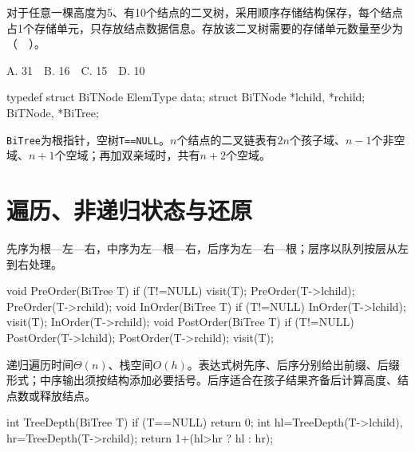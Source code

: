 对于任意一棵高度为5、有10个结点的二叉树，采用顺序存储结构保存，每个结点占1个存储单元，只存放结点数据信息。存放该二叉树需要的存储单元数量至少为（　）。

A. 31　B. 16　C. 15　D. 10

\par\smallskip\noindent\begin{minipage}{\linewidth}
\begin{codeblock}[language={C++}]
typedef struct BiTNode {
    ElemType data;
    struct BiTNode *lchild, *rchild;
} BiTNode, *BiTree;
\end{codeblock}
\end{minipage}\par\smallskip

\texttt{BiTree}为根指针，空树\texttt{T=\allowbreak{}=\allowbreak{}NULL}。\(n\)个结点的二叉链表有\(2n\)个孩子域、\(n-1\)个非空域、\(n+1\)个空域；再加双亲域时，共有\(n+2\)个空域。

\section{遍历、非递归状态与还原}\label{DS05-traversal}

先序为根---左---右，中序为左---根---右，后序为左---右---根；层序以队列按层从左到右处理。

\par\smallskip\noindent\begin{minipage}{\linewidth}
\begin{codeblock}[language={C++}]
void PreOrder(BiTree T) {
    if (T!=NULL) {
        visit(T);
        PreOrder(T->lchild);
        PreOrder(T->rchild);
    }
}
void InOrder(BiTree T) {
    if (T!=NULL) {
        InOrder(T->lchild);
        visit(T);
        InOrder(T->rchild);
    }
}
void PostOrder(BiTree T) {
    if (T!=NULL) {
        PostOrder(T->lchild);
        PostOrder(T->rchild);
        visit(T);
    }
}
\end{codeblock}
\end{minipage}\par\smallskip

递归遍历时间\(\Theta(n)\)、栈空间\(O(h)\)。表达式树先序、后序分别给出前缀、后缀形式；中序输出须按结构添加必要括号。后序适合在孩子结果齐备后计算高度、结点数或释放结点。

\par\smallskip\noindent\begin{minipage}{\linewidth}
\begin{codeblock}[language={C}]
int TreeDepth(BiTree T) {
    if (T==NULL) return 0;
    int hl=TreeDepth(T->lchild), hr=TreeDepth(T->rchild);
    return 1+(hl>hr ? hl : hr);
}
\end{codeblock}
\end{minipage}\par\smallskip

